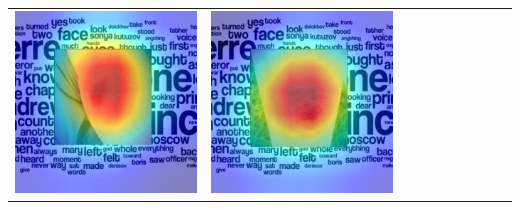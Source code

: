 \begin{landscape}
\begin{table}[]
\begin{tabular}{@{}c c c c c c c c c c@{}}
			\includegraphics[width=.12\textheight ,keepaspectratio]{images/pretraining/gradcam/3/InceptionV4CombinedGradCam.png} &
			\includegraphics[width=.12\textheight ,keepaspectratio]{images/pretraining/gradcam/9/InceptionV4CombinedGradCam.png} &

\end{tabular}
\end{table}
\end{landscape}
